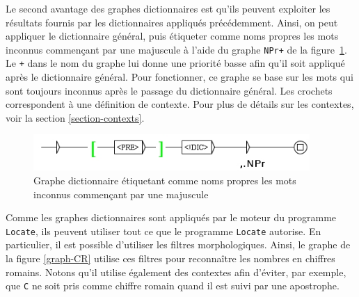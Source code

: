 \bigskip
\noindent Le second avantage des graphes dictionnaires est qu’ils peuvent exploiter les résultats
fournis par les dictionnaires appliqués précédemment. Ainsi, on peut appliquer le dictionnaire
général, puis étiqueter comme noms propres les mots inconnus commençant par une majuscule à l’aide
du graphe \verb$NPr+$ de la figure~\ref{graph-NPr}. Le \verb$+$ dans le nom du graphe lui donne une
priorité basse afin qu’il soit appliqué après le dictionnaire général. Pour fonctionner, ce graphe
se base sur les mots qui sont toujours inconnus après le passage du dictionnaire général. Les
crochets correspondent à une définition de contexte. Pour plus de détails sur les contextes,
 voir la section \ref{section-contexts}.

\begin{figure}[!h]
\begin{center}
\includegraphics[width=10.5cm]{resources/img/fig3-13.png}
\caption{Graphe dictionnaire étiquetant comme noms propres les mots inconnus commençant par une
majuscule
\label{graph-NPr}}
\end{center}
\end{figure}

\bigskip
\noindent Comme les graphes dictionnaires sont appliqués par le moteur du programme \verb+Locate+,
ils peuvent utiliser tout ce que le programme \verb+Locate+ autorise. En particulier, il est
possible d’utiliser les filtres morphologiques.
Ainsi, le graphe de la figure \ref{graph-CR} utilise ces filtres pour reconnaître les nombres en
chiffres romains. Notons qu’il utilise également des contextes afin d’éviter, par exemple, que
\verb+C+ ne soit pris comme chiffre romain quand il est suivi par une apostrophe.


